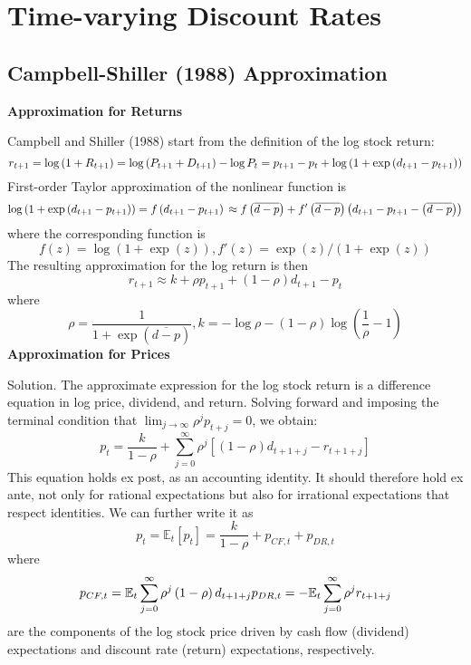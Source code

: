 \documentclass[
]{book}
\begin{document}
\hypertarget{time-varying-discount-rates}{%
\section{Time-varying Discount Rates}\label{time-varying-discount-rates}}

\hypertarget{campbell-shiller-1988-approximation}{%
\subsection{Campbell-Shiller (1988) Approximation}\label{campbell-shiller-1988-approximation}}

\textbf{Approximation for Returns}

Campbell and Shiller (1988) start from the definition of the log stock return:
\[
r_{t+1} =\log\left(1+R_{t+1}\right)=\log\left(P_{t+1}+D_{t+1}\right)-\log P_{t}\\
    =p_{t+1}-p_{t}+\log\left(1+\exp\left(d_{t+1}-p_{t+1}\right)\right)
\]
First-order Taylor approximation of the nonlinear function is
\[
\log\left(1+\exp\left(d_{t+1}-p_{t+1}\right)\right) =f\left(d_{t+1}-p_{t+1}\right)\\
\approx f\left(\overline{d-p}\right)+f'\left(\overline{d-p}\right)\left(d_{t+1}-p_{t+1}-\left(\overline{d-p}\right)\right)
\]
where the corresponding function is
\[
f\left(z\right)=\log\left(1+\exp\left(z\right)\right),f'\left(z\right)=\exp\left(z\right)/\left(1+\exp\left(z\right)\right)
\]
The resulting approximation for the log return is then
\[
r_{t+1}\approx k+\rho p_{t+1}+\left(1-\rho\right)d_{t+1}-p_{t}
\]
where
\[
\rho=\frac{1}{1+\exp\left(\overline{d-p}\right)},k=-\log\rho-\left(1-\rho\right)\log\left(\frac{1}{\rho}-1\right)
\]
\textbf{Approximation for Prices}

Solution. The approximate expression for the log stock return is a difference equation in log price, dividend, and return. Solving forward and imposing the terminal condition that \(\lim_{j\to\infty}\rho^{j}p_{t+j}=0\), we obtain:
\[
p_{t}=\frac{k}{1-\rho}+\sum_{j=0}^{\infty}\rho^{j}\left[\left(1-\rho\right)d_{t+1+j}-r_{t+1+j}\right]
\]
This equation holds ex post, as an accounting identity. It should therefore hold ex ante, not only for rational expectations but also for irrational expectations that respect identities. We can further write it as
\[
p_{t}=\mathbb{E}_{t}\left[p_{t}\right]=\frac{k}{1-\rho}+p_{CF,t}+p_{DR,t}
\]
where
\[
p_{CF,t}=\mathbb{E}_{t}\sum_{j=0}^{\infty}\rho^{j}\left(1-\rho\right)d_{t+1+j}\\
p_{DR,t}=-\mathbb{E}_{t}\sum_{j=0}^{\infty}\rho^{j}r_{t+1+j}
\]
are the components of the log stock price driven by cash flow (dividend) expectations and discount rate (return) expectations, respectively.
\end{document}
